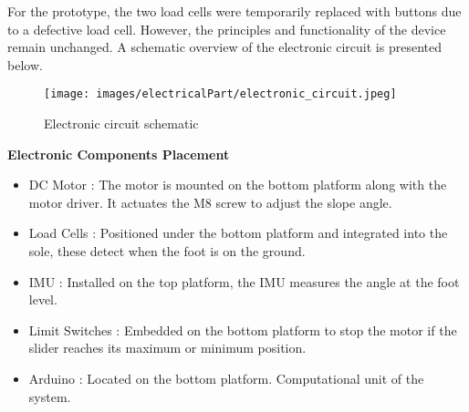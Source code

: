 \documentclass[lettersize,journal]{IEEEtran}
\begin{document}
\medskip
For the prototype, the two load cells were temporarily replaced with buttons due to a defective load cell. However, the principles and functionality of the device remain unchanged. A schematic overview of the electronic circuit is presented below.


\begin{figure}[!h]
    \centering
    \texttt{[image: images/electricalPart/electronic\_circuit.jpeg]}
    \caption{\centering Electronic circuit schematic}
    \label{fig:Electronic_circuit}
\end{figure}

\noindent \textbf{Electronic Components Placement}
\medskip
\begin{itemize}
    \item DC Motor : The motor is mounted on the bottom platform along with the motor driver. It actuates the M8 screw to adjust the slope angle.

    \item Load Cells : Positioned under the bottom platform and integrated into the sole, these detect when the foot is on the ground.

    \item IMU : Installed on the top platform, the IMU measures the angle at the foot level.

    \item Limit Switches : Embedded on the bottom platform to stop the motor if the slider reaches its maximum or minimum position.

    \item Arduino : Located on the bottom platform. Computational unit of the system.
\end{itemize}

\end{document}
